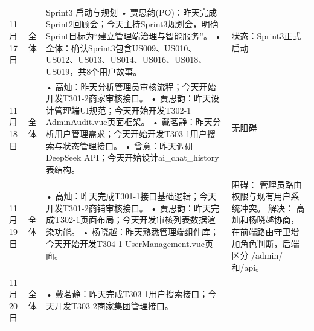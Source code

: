 \begin{levellist}
\begin{longtable}{>{\centering\arraybackslash}m{1cm} >{\centering\arraybackslash}m{1cm} >{\centering\arraybackslash}m{9cm} >{\centering\arraybackslash}m{2.5cm}}
        \bottomrule
        \endfoot


        11月17日                                                                                         & 全体                             & Sprint3 启动与规划 \newline
        • 贾思韵(PO)：昨天完成Sprint2回顾会；今天主持Sprint3规划会，明确Sprint目标为“建立管理端治理与智能服务”。 \newline
        • 全体：确认Sprint3包含US009、US010、US012、US013、US014、US016、US018、US019，共8个用户故事。                       & 状态：Sprint3正式启动                                                                                                       \\
        11月18日                                                                                         & 全体                             & • 高灿：昨天分析管理员审核流程；今天开始开发T301-2商家审核接口。 \newline
        • 贾思韵：昨天设计管理端UI规范；今天开始开发T302-1 AdminAudit.vue页面框架。 \newline
        • 戴茗静：昨天分析用户管理需求；今天开始开发T303-1用户搜索与状态管理接口。 \newline
        • 曾意：昨天调研DeepSeek API；今天开始设计ai\_chat\_history表结构。                                              & 无阻碍                                                                                                                  \\
        11月19日                                                                                         & 全体                             & • 高灿：昨天完成T301-1接口基础逻辑；今天开发T301-2商铺审核接口。 \newline
        • 贾思韵：昨天完成T302-1页面布局；今天开发审核列表数据渲染功能。 \newline
        • 杨晓越：昨天熟悉管理端组件库；今天开始开发T304-1 UserManagement.vue页面。                                            & 阻碍： 管理员路由权限与现有用户系统冲突。 \newline
        解决： 高灿和杨晓越协商，在前端路由守卫增加角色判断，后端区分 /admin/和/api。                                                                                                                                                                         \\
        11月20日                                                                                         & 全体                             & • 戴茗静：昨天完成T303-1用户搜索接口；今天开发T303-2商家集团管理接口。 \newline

\end{longtable}
\end{levellist}
